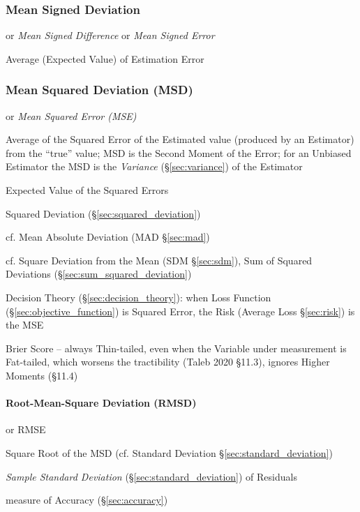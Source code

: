 \subsubsection{Mean Signed Deviation}\label{sec:mean_signed_deviation}

or \emph{Mean Signed Difference} or \emph{Mean Signed Error}

Average (Expected Value) of Estimation Error



\subsubsection{Mean Squared Deviation (MSD)}\label{sec:msd}

or \emph{Mean Squared Error (MSE)}

Average of the Squared Error of the Estimated value (produced by an Estimator)
from the ``true'' value; MSD is the Second Moment of the Error; for an Unbiased
Estimator the MSD is the \emph{Variance} (\S\ref{sec:variance}) of the Estimator

Expected Value of the Squared Errors

Squared Deviation (\S\ref{sec:squared_deviation})

cf. Mean Absolute Deviation (MAD \S\ref{sec:mad})

cf. Square Deviation from the Mean (SDM \S\ref{sec:sdm}), Sum of Squared
Deviations (\S\ref{sec:sum_squared_deviation})

\fist Decision Theory (\S\ref{sec:decision_theory}): when Loss Function
(\S\ref{sec:objective_function}) is Squared Error, the Risk (Average Loss
\S\ref{sec:risk}) is the MSE

Brier Score -- always Thin-tailed, even when the Variable under measurement is
Fat-tailed, which worsens the tractibility (Taleb 2020 \S 11.3), ignores Higher
Moments (\S 11.4)



\paragraph{Root-Mean-Square Deviation (RMSD)}\label{sec:rmsd}\hfill

or RMSE

Square Root of the MSD (cf. Standard Deviation \S\ref{sec:standard_deviation})

\emph{Sample Standard Deviation} (\S\ref{sec:standard_deviation}) of Residuals

measure of Accuracy (\S\ref{sec:accuracy})



